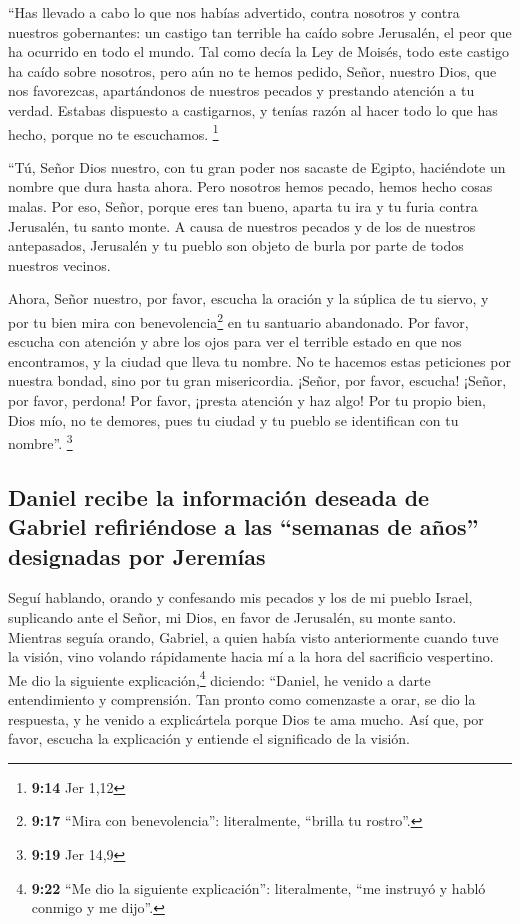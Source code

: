  ``Has llevado a cabo lo que nos habías advertido, contra
nosotros y contra nuestros gobernantes: un castigo tan terrible ha caído
sobre Jerusalén, el peor que ha ocurrido en todo el mundo.
 Tal como decía la Ley de Moisés, todo este castigo ha
caído sobre nosotros, pero aún no te hemos pedido, Señor, nuestro Dios,
que nos favorezcas, apartándonos de nuestros pecados y prestando
atención a tu verdad.  Estabas dispuesto a castigarnos, y
tenías razón al hacer todo lo que has hecho, porque no te escuchamos.
\footnote{\textbf{9:14} Jer 1,12}

 ``Tú, Señor Dios nuestro, con tu gran poder nos sacaste
de Egipto, haciéndote un nombre que dura hasta ahora. Pero nosotros
hemos pecado, hemos hecho cosas malas.  Por eso, Señor,
porque eres tan bueno, aparta tu ira y tu furia contra Jerusalén, tu
santo monte. A causa de nuestros pecados y de los de nuestros
antepasados, Jerusalén y tu pueblo son objeto de burla por parte de
todos nuestros vecinos.

 Ahora, Señor nuestro, por favor, escucha la oración y la
súplica de tu siervo, y por tu bien mira con benevolencia\footnote{\textbf{9:17}
  ``Mira con benevolencia'': literalmente, ``brilla tu rostro''.} en tu
santuario abandonado.  Por favor, escucha con atención y
abre los ojos para ver el terrible estado en que nos encontramos, y la
ciudad que lleva tu nombre. No te hacemos estas peticiones por nuestra
bondad, sino por tu gran misericordia.  ¡Señor, por
favor, escucha! ¡Señor, por favor, perdona! Por favor, ¡presta atención
y haz algo! Por tu propio bien, Dios mío, no te demores, pues tu ciudad
y tu pueblo se identifican con tu nombre''. \footnote{\textbf{9:19} Jer
  14,9}

\hypertarget{daniel-recibe-la-informaciuxf3n-deseada-de-gabriel-refiriuxe9ndose-a-las-semanas-de-auxf1os-designadas-por-jeremuxedas}{%
\subsection{Daniel recibe la información deseada de Gabriel refiriéndose
a las ``semanas de años'' designadas por
Jeremías}\label{daniel-recibe-la-informaciuxf3n-deseada-de-gabriel-refiriuxe9ndose-a-las-semanas-de-auxf1os-designadas-por-jeremuxedas}}

 Seguí hablando, orando y confesando mis pecados y los de
mi pueblo Israel, suplicando ante el Señor, mi Dios, en favor de
Jerusalén, su monte santo.  Mientras seguía orando,
Gabriel, a quien había visto anteriormente cuando tuve la visión, vino
volando rápidamente hacia mí a la hora del sacrificio vespertino.
 Me dio la siguiente explicación,\footnote{\textbf{9:22}
  ``Me dio la siguiente explicación'': literalmente, ``me instruyó y
  habló conmigo y me dijo''.} diciendo: ``Daniel, he venido a darte
entendimiento y comprensión.  Tan pronto como comenzaste
a orar, se dio la respuesta, y he venido a explicártela porque Dios te
ama mucho. Así que, por favor, escucha la explicación y entiende el
significado de la visión.

